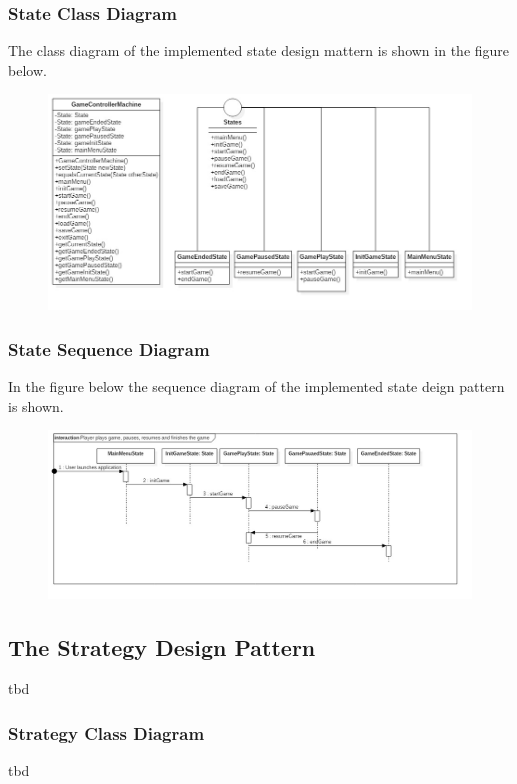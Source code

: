 \documentclass{article}
\begin{document}
\newpage
\subsubsection{State Class Diagram}
The class diagram of the implemented state design mattern is shown in the figure below.
\begin{figure}[H]
\includegraphics[scale=0.50]{Images/StateMachineClassDiagram.jpg}
\end{figure}

\subsubsection{State Sequence Diagram}
In the figure below the sequence diagram of the implemented state deign pattern is shown.
\begin{figure}[H]
\includegraphics[scale=0.40]{Images/StateMachineSequenceDiagram.jpg}
\end{figure}

\subsection{The Strategy Design Pattern}
tbd

\subsubsection{Strategy Class Diagram}
tbd
\end{document}
